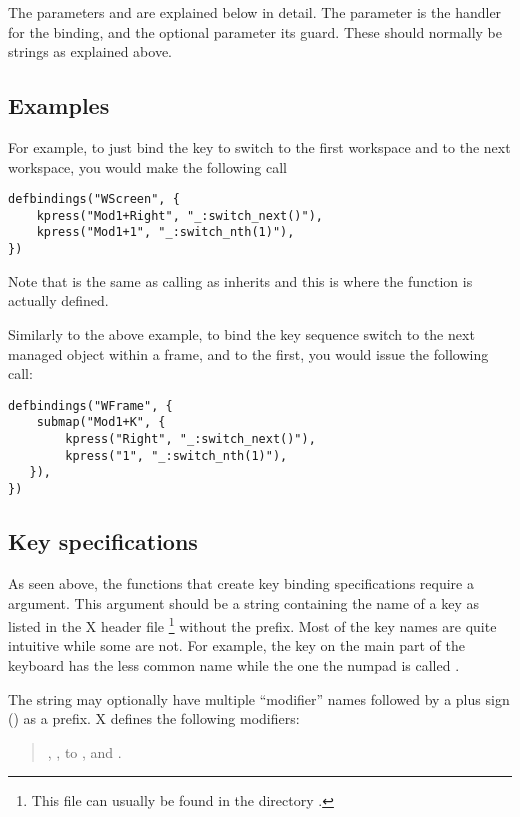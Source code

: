 The parameters  and  are explained below
in detail. The parameter  is the handler for the binding,
and the optional parameter  its guard. These should normally
be strings as explained above. 

\subsection{Examples}

For example, to just bind the key  to switch to the first
workspace and  to the next workspace, you would make the
following call
\begin{verbatim}
defbindings("WScreen", {
    kpress("Mod1+Right", "_:switch_next()"),
    kpress("Mod1+1", "_:switch_nth(1)"),
})
\end{verbatim}

Note that  is the same as calling
 as  inherits
 and this is where the function is actually defined.

Similarly to the above example, to bind the key sequence  
switch to the next managed object within a frame, and  to the
first, you would issue the following call:
\begin{verbatim}
defbindings("WFrame", {
    submap("Mod1+K", {
        kpress("Right", "_:switch_next()"),
        kpress("1", "_:switch_nth(1)"),
   }),
})
\end{verbatim}


\subsection{Key specifications}

As seen above, the functions that create key binding specifications require
a  argument. This argument should be a string containing the
name of a key as listed in the X header file %
\footnote{This file can usually be found in the directory
.} without the  prefix.
Most of the key names are quite intuitive while some are not. For example,
the  key on the main part of the keyboard has the less common
name  while the one the numpad is called .

The  string may optionally have multiple ``modifier'' names
followed by a plus sign (\code{+}) as a prefix. X defines the following
modifiers:
\begin{quotation}
, ,  to ,
 and .
\end{quotation}

